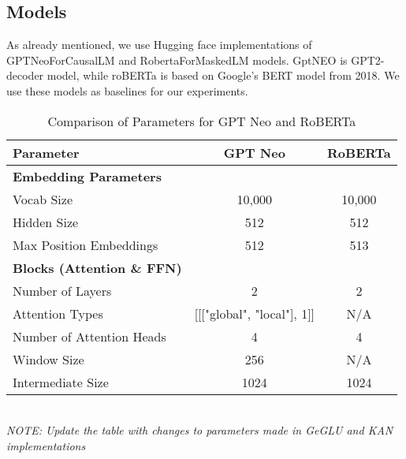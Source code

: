 \subsection{Models}
As already mentioned, we use Hugging face implementations of GPTNeoForCausalLM \cite{huggingfaceNEO} and RobertaForMaskedLM \cite{huggingfaceRoberta} models. GptNEO is GPT2- decoder model, while roBERTa is based on Google's BERT model from 2018. We use these models as baselines for our experiments.
\begin{table*}[h!]
    \centering
    \begin{tabular}{|l|c|c|}
    \hline
    \textbf{Parameter} & \textbf{GPT Neo} & \textbf{RoBERTa} \\ \hline
    \textbf{Embedding Parameters} & & \\ \hline
    Vocab Size & 10,000 & 10,000 \\ \hline
    Hidden Size & 512 & 512 \\ \hline
    Max Position Embeddings & 512 & 513 \\ \hline
    \textbf{Blocks (Attention \& FFN)} & & \\ \hline
    Number of Layers & 2 & 2 \\ \hline
    Attention Types & [[["global", "local"], 1]] & N/A \\ \hline
    Number of Attention Heads & 4 & 4 \\ \hline
    Window Size & 256 & N/A \\ \hline
    Intermediate Size & 1024 & 1024 \\ \hline
    \end{tabular}
    \caption{Comparison of Parameters for GPT Neo and RoBERTa}
\end{table*}
\\

\textit{NOTE: Update the table with changes to parameters made in GeGLU and KAN implementations}

